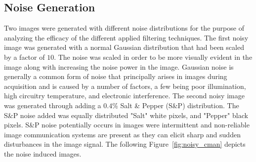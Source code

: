 \documentclass{article}
\begin{document}
\subsection{Noise Generation}
Two images were generated with different noise distributions for the purpose of analyzing the efficacy of the different applied filtering techniques. The first noisy image was generated with a normal Gaussian distribution that had been scaled by a factor of $10$. The noise was scaled in order to be more visually evident in the image along with increasing the noise power in the image. Gaussian noise is generally a common form of noise that principally arises in images during acquisition and is caused by a number of factors, a few being poor illumination, high circuitry temperature, and electronic interference. The second noisy image was generated through adding a $0.4\%$ Salt \& Pepper (S\&P) distribution. The S\&P noise added was equally distributed "Salt" white pixels, and "Pepper" black pixels. S\&P noise potentially occurs in images were intermittent and non-reliable image communication systems are present as they can elicit sharp and sudden disturbances in the image signal. The following Figure~\ref{fig:noisy_cman} depicts the noise induced images.
\end{document}
